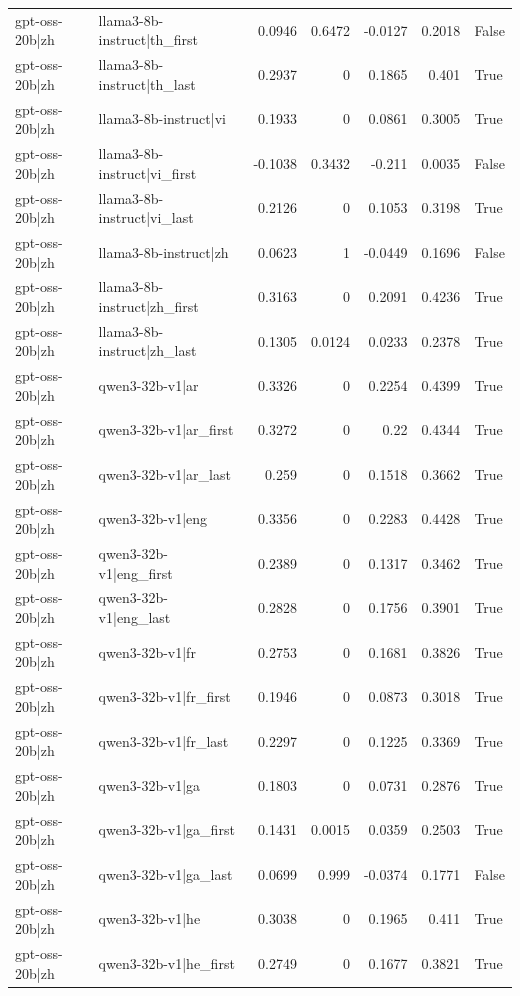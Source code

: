 \begin{table}
\begin{tabular}{l l r r r r l}
gpt-oss-20b|zh & llama3-8b-instruct|th_first & 0.0946 & 0.6472 & -0.0127 & 0.2018 & False \\
gpt-oss-20b|zh & llama3-8b-instruct|th_last & 0.2937 & 0 & 0.1865 & 0.401 & True \\
gpt-oss-20b|zh & llama3-8b-instruct|vi & 0.1933 & 0 & 0.0861 & 0.3005 & True \\
gpt-oss-20b|zh & llama3-8b-instruct|vi_first & -0.1038 & 0.3432 & -0.211 & 0.0035 & False \\
gpt-oss-20b|zh & llama3-8b-instruct|vi_last & 0.2126 & 0 & 0.1053 & 0.3198 & True \\
gpt-oss-20b|zh & llama3-8b-instruct|zh & 0.0623 & 1 & -0.0449 & 0.1696 & False \\
gpt-oss-20b|zh & llama3-8b-instruct|zh_first & 0.3163 & 0 & 0.2091 & 0.4236 & True \\
gpt-oss-20b|zh & llama3-8b-instruct|zh_last & 0.1305 & 0.0124 & 0.0233 & 0.2378 & True \\
gpt-oss-20b|zh & qwen3-32b-v1|ar & 0.3326 & 0 & 0.2254 & 0.4399 & True \\
gpt-oss-20b|zh & qwen3-32b-v1|ar_first & 0.3272 & 0 & 0.22 & 0.4344 & True \\
gpt-oss-20b|zh & qwen3-32b-v1|ar_last & 0.259 & 0 & 0.1518 & 0.3662 & True \\
gpt-oss-20b|zh & qwen3-32b-v1|eng & 0.3356 & 0 & 0.2283 & 0.4428 & True \\
gpt-oss-20b|zh & qwen3-32b-v1|eng_first & 0.2389 & 0 & 0.1317 & 0.3462 & True \\
gpt-oss-20b|zh & qwen3-32b-v1|eng_last & 0.2828 & 0 & 0.1756 & 0.3901 & True \\
gpt-oss-20b|zh & qwen3-32b-v1|fr & 0.2753 & 0 & 0.1681 & 0.3826 & True \\
gpt-oss-20b|zh & qwen3-32b-v1|fr_first & 0.1946 & 0 & 0.0873 & 0.3018 & True \\
gpt-oss-20b|zh & qwen3-32b-v1|fr_last & 0.2297 & 0 & 0.1225 & 0.3369 & True \\
gpt-oss-20b|zh & qwen3-32b-v1|ga & 0.1803 & 0 & 0.0731 & 0.2876 & True \\
gpt-oss-20b|zh & qwen3-32b-v1|ga_first & 0.1431 & 0.0015 & 0.0359 & 0.2503 & True \\
gpt-oss-20b|zh & qwen3-32b-v1|ga_last & 0.0699 & 0.999 & -0.0374 & 0.1771 & False \\
gpt-oss-20b|zh & qwen3-32b-v1|he & 0.3038 & 0 & 0.1965 & 0.411 & True \\
gpt-oss-20b|zh & qwen3-32b-v1|he_first & 0.2749 & 0 & 0.1677 & 0.3821 & True \\

\end{tabular}
\end{table}
